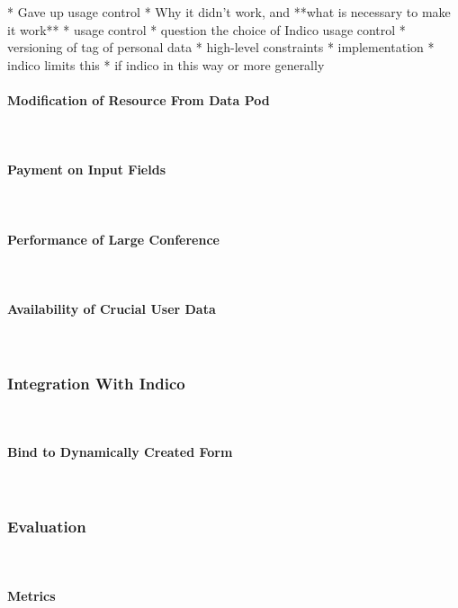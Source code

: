 * Gave up usage control
  * Why it didn't work, and **what is necessary to make it work**
    * usage control
    * question the choice of Indico usage control
    * versioning of tag of personal data
* high-level constraints
* implementation
  * indico limits this
* if indico in this way or more generally

\paragraph{Modification of Resource From Data Pod}\mbox{}\\

\paragraph{Payment on Input Fields}\mbox{}\\

\paragraph{Performance of Large Conference}\mbox{}\\

\paragraph{Availability of Crucial User Data}\mbox{}\\

\subsubsection{Integration With Indico}\mbox{}\\

\paragraph{Bind to Dynamically Created Form}\mbox{}\\

\subsubsection{Evaluation}\mbox{}\\

\paragraph{Metrics}\mbox{}\\
